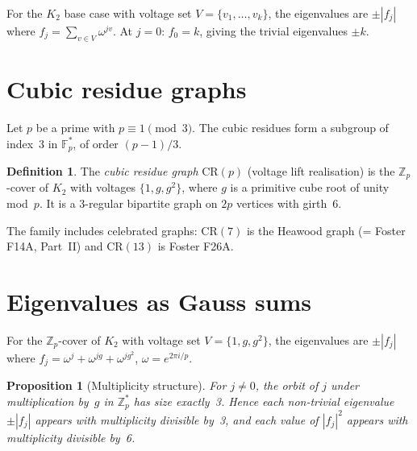 \documentclass[11pt,a4paper]{article}
\theoremstyle{plain}
\newtheorem{proposition}[theorem]{Proposition}
\theoremstyle{definition}
\newtheorem{definition}[theorem]{Definition}
\theoremstyle{remark}
\newcommand{\Z}{\mathbb{Z}}
\newcommand{\F}{\mathbb{F}}
\newcommand{\CR}{\mathrm{CR}}
\begin{document}
For the $K_2$ base case with voltage set $V = \{v_1, \ldots, v_k\}$, the
eigenvalues are $\pm |f_j|$ where $f_j = \sum_{v \in V} \omega^{jv}$.
At $j = 0$: $f_0 = k$, giving the trivial eigenvalues $\pm k$.


\section{Cubic residue graphs}

Let $p$ be a prime with $p \equiv 1 \pmod{3}$. The cubic residues form a
subgroup of index~3 in $\F_p^*$, of order $(p-1)/3$.

\begin{tcolorbox}[colback=green!8, colframe=green!8,
  boxrule=0pt, sharp corners]
\begin{definition}
The \emph{cubic residue graph} $\CR(p)$ (voltage lift realisation) is the
$\Z_p$-cover of $K_2$ with voltages $\{1, g, g^2\}$, where $g$ is a
primitive cube root of unity mod~$p$. It is a 3-regular bipartite graph on
$2p$ vertices with girth~6.
\end{definition}
\end{tcolorbox}

The family includes celebrated graphs: $\CR(7)$ is the Heawood graph
(= Foster F14A, Part~II) and $\CR(13)$ is Foster F26A.


\section{Eigenvalues as Gauss sums}

For the $\Z_p$-cover of $K_2$ with voltage set $V = \{1, g, g^2\}$, the
eigenvalues are $\pm |f_j|$ where
$f_j = \omega^j + \omega^{jg} + \omega^{jg^2}$, $\omega = e^{2\pi i/p}$.

\begin{tcolorbox}[colback=black!5, colframe=black!5,
  boxrule=0pt, sharp corners]
\begin{proposition}[Multiplicity structure]
For $j \neq 0$, the orbit of $j$ under multiplication by~$g$ in $\Z_p^*$ has
size exactly~3. Hence each non-trivial eigenvalue $\pm|f_j|$ appears with
multiplicity divisible by~3, and each value of $|f_j|^2$ appears with
multiplicity divisible by~6.
\end{proposition}
\end{tcolorbox}
\end{document}
